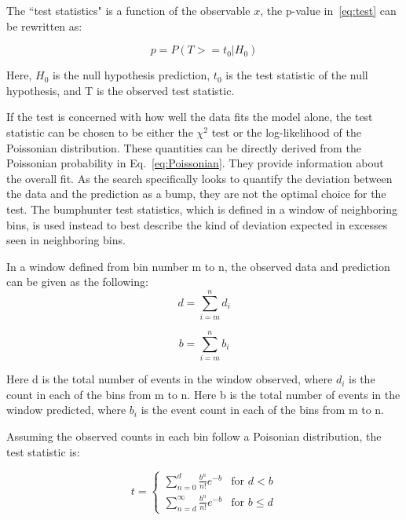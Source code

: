 The ``test statistics" is a function of the observable $x$, the p-value in~\ref{eq:test} can be rewritten as:
    
\begin{equation}
    p = P(T>=t_{0}| H_{0})
\label{eq:pvaluetestStats}
\end{equation}

Here, $H_0$ is the null hypothesis prediction, $t_0$ is the test statistic of the null hypothesis, and T is the observed test statistic.


If the test is concerned with how well the data fits the model alone, the test statistic can be chosen to be either the $\chi^{2}$ test or the log-likelihood of the Poissonian distribution. These quantities can be directly derived from the Poissonian probability in Eq.~\ref{eq:Poissonian}. They provide information about the overall fit. As the search specifically looks to quantify the deviation between the data and the prediction as a bump, they are not the optimal choice for the test. 
The bumphunter test statistics, which is defined in a window of neighboring bins, is used instead to best describe the kind of deviation expected in excesses seen in neighboring bins. 

In a window defined from bin number m to n, the observed data and prediction can be given as the following: 
    \begin{equation}
         d= \sum_{i=m}^{n} d_i 
    \end{equation}

    
    \begin{equation}
         b= \sum_{i=m}^{n} b_i
    \end{equation}

    Here d is the total number of events in the window observed, where $d_i$ is the count in each of the bins from m to n. 
    Here b is the total number of events in the window predicted, where $b_i$ is the event count in each of the bins from m to n.
    
    Assuming the observed counts in each bin follow a Poisonian distribution, the test statistic is:

	\begin{equation}
    t=
    \begin{cases} \sum_{n=0}^{d} \frac{b^{n}}{n!} e^{-b} &  \textrm{for $d < b$}
    \\
    \sum_{n=d}^{\infty} \frac{b^n}{n!} e^{-b} &  \textrm{for $b \leq d$}
    \end{cases}
    \end{equation}

